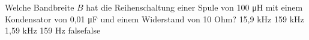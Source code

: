     {Welche Bandbreite $B$ hat die Reihenschaltung einer Spule von 100 \si{\micro\henry} mit einem Kondensator von 0,01 \si{\micro\farad} und einem Widerstand von 10 Ohm?}
    {15,9 kHz}
    {159 kHz}
    {1,59 kHz}
    {159 Hz}
    {false}{false}